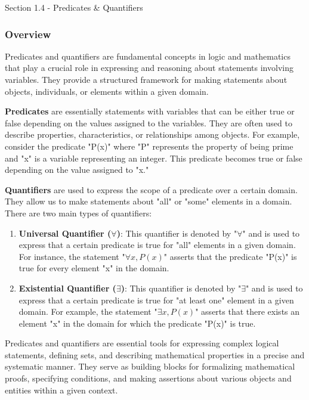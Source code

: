 \begin{notes}{Section 1.4 - Predicates \& Quantifiers}
    \subsubsection*{Overview}

    Predicates and quantifiers are fundamental concepts in logic and mathematics that play a crucial role in expressing and reasoning about statements involving variables. They provide a structured framework for making statements about 
    objects, individuals, or elements within a given domain.

    \textbf{Predicates} are essentially statements with variables that can be either true or false depending on the values assigned to the variables. They are often used to describe properties, characteristics, or relationships among 
    objects. For example, consider the predicate "P(x)" where "P" represents the property of being prime and "x" is a variable representing an integer. This predicate becomes true or false depending on the value assigned to "x."

    \textbf{Quantifiers} are used to express the scope of a predicate over a certain domain. They allow us to make statements about "all" or "some" elements in a domain. There are two main types of quantifiers:

    \begin{enumerate}
        \item \textbf{Universal Quantifier ($\forall$)}: This quantifier is denoted by "$\forall$" and is used to express that a certain predicate is true for "all" elements in a given domain. For instance, the statement "$\forall x, P(x)$" 
        asserts that the predicate "P(x)" is true for every element "x" in the domain.
        \item \textbf{Existential Quantifier ($\exists$)}: This quantifier is denoted by "$\exists$" and is used to express that a certain predicate is true for "at least one" element in a given domain. For example, the statement "$\exists x, 
        P(x)$" asserts that there exists an element "x" in the domain for which the predicate "P(x)" is true.
    \end{enumerate}

    Predicates and quantifiers are essential tools for expressing complex logical statements, defining sets, and describing mathematical properties in a precise and systematic manner. They serve as building blocks for formalizing mathematical 
    proofs, specifying conditions, and making assertions about various objects and entities within a given context.


\end{notes}
